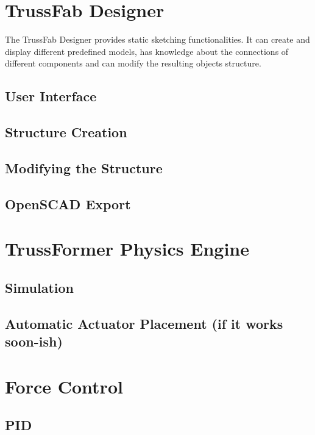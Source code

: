 \section{TrussFab Designer}
The TrussFab Designer provides static sketching functionalities. It can create and display different predefined models, has knowledge about the connections of different components and can modify the resulting objects structure.
\subsection{User Interface}
\subsection{Structure Creation}
\subsection{Modifying the Structure}
\subsection{OpenSCAD Export}\label{sec:openscad_impl}
\section{TrussFormer Physics Engine}
\subsection{Simulation}
\subsection{Automatic Actuator Placement (if it works soon-ish)}
\section{Force Control}
\subsection{PID}
